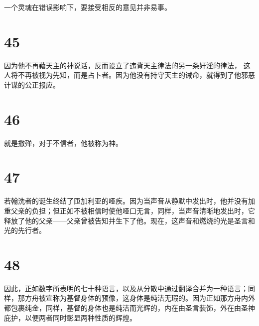 一个灵魂在错误影响下，要接受相反的意见并非易事。\par


\section{45}

 因为他不再藉天主的神说话，反而设立了违背天主律法的另一条奸淫的律法， 这人将不再被视为先知，而是占卜者。因为他没有持守天主的诫命，就得到了他邪恶计谋的公正报应。\par


\section{46}

 就是撒殚，对于不信者，他被称为神。\par


\section{47}

若翰洗者的诞生终结了匝加利亚的哑疾。因为当声音从静默中发出时，他并没有加重父亲的负担；但正如不被相信时使他哑口无言，同样，当声音清晰地发出时，它释放了他的父亲——父亲曾被告知并生下了他。现在，这声音和燃烧的光是圣言和光的先行者。\par


\section{48}

因此，正如数字所表明的七十种语言，以及从分散中通过翻译合并为一种语言；同样，那方舟被宣称为基督身体的预像，这身体是纯洁无瑕的。因为正如那方舟内外都包裹纯金，同样，基督的身体也是纯洁而光辉的，内在由圣言装饰，外在由圣神庇护，以便两者同时彰显两种性质的辉煌。\par

